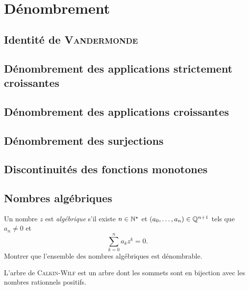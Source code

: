 \chapter{Dénombrement}

\section{Identité de \textsc{Vandermonde}}


\section{Dénombrement des applications strictement croissantes}


\section{Dénombrement des applications croissantes}


\section{Dénombrement des surjections} \label{denombrement_surjections}


\section{Discontinuités des fonctions monotones}


\section{Nombres algébriques}
\begin{exercice}
Un nombre $z$ est \emph{algébrique} s'il existe $n \in \mathbb{N}^\star$ et $(a_0, \dots, a_n) \in \mathbb{Q}^{n+1}$ tels que $a_n \not=0$ et 
$$\sum_{k=0}^n a_k z^k = 0.$$
Montrer que l'ensemble des nombres algébriques est dénombrable. 
\end{exercice}


\begin{marginfigure}
    
    \note L'arbre de \textsc{Calkin}-\textsc{Wilf} est un arbre dont les sommets sont en bijection avec les nombres rationnels positifs.
\end{marginfigure}


